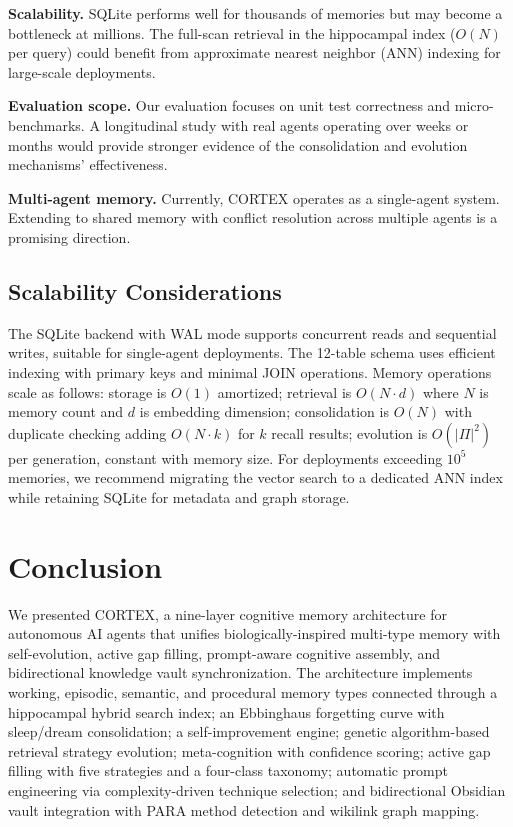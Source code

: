 \documentclass[runningheads]{llncs}
\begin{document}
\textbf{Scalability.} SQLite performs well for thousands of memories but may become a bottleneck at millions. The full-scan retrieval in the hippocampal index ($O(N)$ per query) could benefit from approximate nearest neighbor (ANN) indexing for large-scale deployments.

\textbf{Evaluation scope.} Our evaluation focuses on unit test correctness and micro-benchmarks. A longitudinal study with real agents operating over weeks or months would provide stronger evidence of the consolidation and evolution mechanisms' effectiveness.

\textbf{Multi-agent memory.} Currently, CORTEX operates as a single-agent system. Extending to shared memory with conflict resolution across multiple agents is a promising direction.

\subsection{Scalability Considerations}

The SQLite backend with WAL mode supports concurrent reads and sequential writes, suitable for single-agent deployments. The 12-table schema uses efficient indexing with primary keys and minimal JOIN operations. Memory operations scale as follows: storage is $O(1)$ amortized; retrieval is $O(N \cdot d)$ where $N$ is memory count and $d$ is embedding dimension; consolidation is $O(N)$ with duplicate checking adding $O(N \cdot k)$ for $k$ recall results; evolution is $O(|\Pi|^2)$ per generation, constant with memory size. For deployments exceeding $10^5$ memories, we recommend migrating the vector search to a dedicated ANN index while retaining SQLite for metadata and graph storage.

\section{Conclusion}\label{sec:conclusion}

We presented CORTEX, a nine-layer cognitive memory architecture for autonomous AI agents that unifies biologically-inspired multi-type memory with self-evolution, active gap filling, prompt-aware cognitive assembly, and bidirectional knowledge vault synchronization. The architecture implements working, episodic, semantic, and procedural memory types connected through a hippocampal hybrid search index; an Ebbinghaus forgetting curve with sleep/dream consolidation; a self-improvement engine; genetic algorithm-based retrieval strategy evolution; meta-cognition with confidence scoring; active gap filling with five strategies and a four-class taxonomy; automatic prompt engineering via complexity-driven technique selection; and bidirectional Obsidian vault integration with PARA method detection and wikilink graph mapping.
\end{document}
